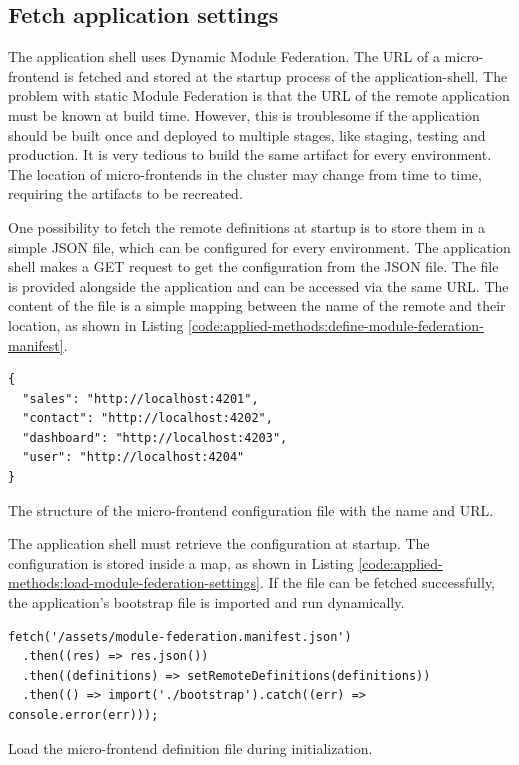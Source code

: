 \subsection{Fetch application settings}\label{subsection:applied-methods:prototypical-implementation
:load-remote-settings}

The application shell uses Dynamic Module Federation. The \ac{URL} of a micro-frontend is fetched and stored at the startup process of the application-shell. The problem with static Module Federation is that the \ac{URL} of the remote application must be known at build time. However, this is troublesome if the application should be built once and deployed to multiple stages, like staging, testing and production. It is very tedious to build the same artifact for every environment. The location of micro-frontends in the cluster may change from time to time, requiring the artifacts to be recreated.

\bigskip

\noindent One possibility to fetch the remote definitions at startup is to store them in a simple \ac{JSON} file, which can be configured for every environment. The application shell makes a GET request to get the configuration from the \ac{JSON} file. The file is provided alongside the application and can be accessed via the same \ac{URL}. The content of the file is a simple mapping between the name of the remote and their location, as shown in Listing \ref{code:applied-methods:define-module-federation-manifest}.

\ifshowListings
\begin{listing}[H]
\begin{verbatim}
{
  "sales": "http://localhost:4201",
  "contact": "http://localhost:4202",
  "dashboard": "http://localhost:4203",
  "user": "http://localhost:4204"
}
\end{verbatim}
\caption{The structure of the micro-frontend configuration file with the name and \ac{URL}.}\label{code:applied-methods:define-module-federation-manifest}
\end{listing}
\fi

\noindent The application shell must retrieve the configuration at startup. The configuration is stored inside a map, as shown in Listing \ref{code:applied-methods:load-module-federation-settings}. If the file can be fetched successfully, the application's bootstrap file is imported and run dynamically.

\ifshowListings
\begin{listing}[H]
\begin{verbatim}
fetch('/assets/module-federation.manifest.json')
  .then((res) => res.json())
  .then((definitions) => setRemoteDefinitions(definitions))
  .then(() => import('./bootstrap').catch((err) => console.error(err)));
\end{verbatim}
\caption{Load the micro-frontend definition file during initialization.}\label{code:applied-methods:load-module-federation-settings}
\end{listing}
\fi

